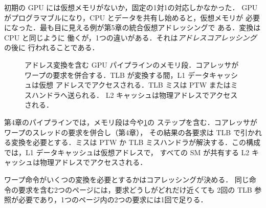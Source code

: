 \documentclass[../main.tex]{subfiles}
\begin{document}
初期の GPU には仮想メモリがないか，固定の1対1の対応しかなかった．
GPU がプログラマブルになり，CPU とデータを共有し始めると，仮想メモリが
必要になった．最も目に見える例が第5章の統合仮想アドレッシングで
ある．変換は CPU と同じように
働くが，1つの違いがある．それは\emph{アドレスコアレッシング}の後に
行われることである．

\begin{figure}[tb]
  \centering
  
  \caption{アドレス変換を含む GPU パイプラインのメモリ段．コアレッサが
    ワープの要求を併合する．TLB が変換する間，L1 データキャッシュは仮想
    アドレスでアクセスされる．TLB ミスは PTW またはミスハンドラへ送られる．
    L2 キャッシュは物理アドレスでアクセスされる．}
  \label{fig:l07-gpu-mmu}
\end{figure}

第4章のパイプラインでは，メモリ段は今や\cref{fig:l07-gpu-mmu}の
ステップを含む．コアレッサがワープのスレッドの要求を併合し（第4章），
その結果の各要求は TLB で引かれる変換を必要とする．ミスは PTW か TLB
ミスハンドラが解決する．この構成では，L1 データキャッシュは仮想アドレスで，
すべての SM が共有する L2 キャッシュは物理アドレスでアクセスされる．

ワープ命令がいくつの変換を必要とするかはコアレッシングが決める．
同じ命令の要求を含む2つのページには，要求どうしがどれだけ近くても
2回の TLB 参照が必要であり，1つのページ内の2つの要求には1回で足りる．
\end{document}

